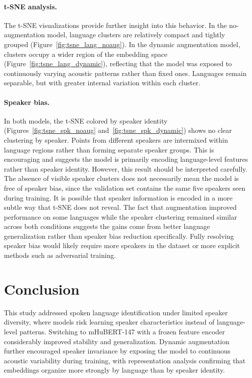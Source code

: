 \documentclass[11pt]{article}
\begin{document}
\paragraph{t-SNE analysis.}
The t-SNE visualizations provide further insight into this behavior. In 
the no-augmentation model, language clusters are relatively compact and 
tightly grouped (Figure~\ref{fig:tsne_lang_noaug}). In the dynamic 
augmentation model, clusters occupy a wider region of the embedding space 
(Figure~\ref{fig:tsne_lang_dynamic}), reflecting that the model was 
exposed to continuously varying acoustic patterns rather than fixed ones. 
Languages remain separable, but with greater internal variation within 
each cluster.

\paragraph{Speaker bias.}
In both models, the t-SNE colored by speaker identity 
(Figures~\ref{fig:tsne_spk_noaug} and~\ref{fig:tsne_spk_dynamic}) shows 
no clear clustering by speaker. Points from different speakers are 
intermixed within language regions rather than forming separate speaker 
groups. This is encouraging and suggests the model is primarily encoding 
language-level features rather than speaker identity. However, this result 
should be interpreted carefully. The absence of visible speaker clusters 
does not necessarily mean the model is free of speaker bias, 
since the validation set contains the same five speakers seen during 
training. It is possible that speaker information is encoded in a more 
subtle way that t-SNE does not reveal. The fact that augmentation improved 
performance on some languages while the speaker clustering remained similar 
across both conditions suggests the gains come from better language 
generalization rather than speaker bias reduction specifically. Fully 
resolving speaker bias would likely require more speakers in the dataset 
or more explicit methods such as adversarial training.

\section{Conclusion}
This study addressed spoken language identification under limited speaker 
diversity, where models risk learning speaker characteristics instead of 
language-level patterns. Switching to mHuBERT-147 with a frozen feature 
encoder considerably improved stability and generalization. Dynamic 
augmentation further encouraged speaker invariance by exposing the model 
to continuous acoustic variability during training, with representation 
analysis confirming that embeddings organize more strongly by language 
than by speaker identity.
\end{document}
